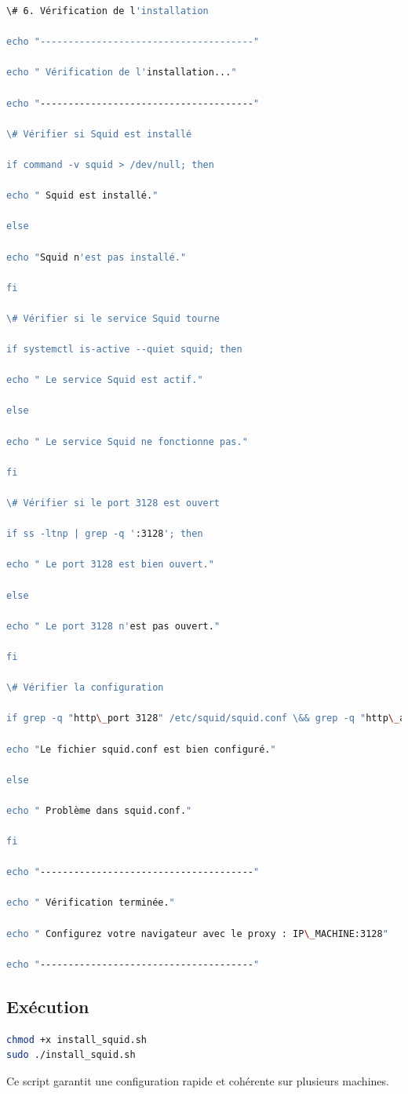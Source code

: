 \documentclass[12pt,a4paper]{article}
\begin{document}
\begin{lstlisting}[language=bash]
\# 6. Vérification de l'installation

echo "--------------------------------------"

echo " Vérification de l'installation..."

echo "--------------------------------------"

\# Vérifier si Squid est installé

if command -v squid > /dev/null; then

echo " Squid est installé."

else

echo "Squid n'est pas installé."

fi

\# Vérifier si le service Squid tourne

if systemctl is-active --quiet squid; then

echo " Le service Squid est actif."

else

echo " Le service Squid ne fonctionne pas."

fi

\# Vérifier si le port 3128 est ouvert

if ss -ltnp | grep -q ':3128'; then

echo " Le port 3128 est bien ouvert."

else

echo " Le port 3128 n'est pas ouvert."

fi

\# Vérifier la configuration

if grep -q "http\_port 3128" /etc/squid/squid.conf \&& grep -q "http\_access allow" /etc/squid/squid.conf; then

echo "Le fichier squid.conf est bien configuré."

else

echo " Problème dans squid.conf."

fi

echo "--------------------------------------"

echo " Vérification terminée."

echo " Configurez votre navigateur avec le proxy : IP\_MACHINE:3128"

echo "--------------------------------------" 
\end{lstlisting}

\subsection{Exécution}
\begin{lstlisting}[language=bash]
chmod +x install_squid.sh
sudo ./install_squid.sh
\end{lstlisting}
Ce script garantit une configuration rapide et cohérente sur plusieurs machines.
\end{document}
